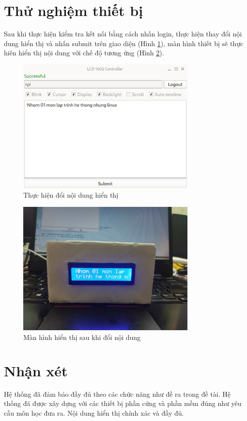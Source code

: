 \documentclass{report}
\begin{document}
\section{Thử nghiệm thiết bị}
Sau khi thực hiện kiểm tra kết nối bằng cách nhấn login, thực hiện thay đổi nội dung hiển thị và nhấn submit trên giao diện (Hình \ref{gui-change-content}), màn hình thiết bị sẽ thực hiên hiển thị nội dung với chế độ tương ứng (Hình \ref{dev-change-content}).
\begin{figure}[H]
	\centering
	\includegraphics[width=0.8\textwidth]{../images/Screenshot from 2023-06-10 11-05-54.png}
	\caption{Thực hiện đổi nội dung hiển thị}
	\label{gui-change-content}
\end{figure}
\begin{figure}[H]
	\centering
	\includegraphics[width=0.8\textwidth]{../images/man-hinh-thay-doi.jpg}
	\caption{Màn hình hiển thị sau khi đổi nội dung}
	\label{dev-change-content}
\end{figure}
\section{Nhận xét}
Hệ thống đã đảm bảo đầy đủ theo các chức năng như đề ra trong đề tài. Hệ
thống đã được xây dựng với các thiết bị phần cứng và phần mềm đúng như yêu
cầu môn học đưa ra. Nội dung hiển thị chính xác và đầy đủ.
\end{document}
